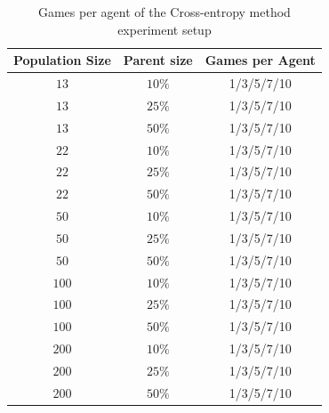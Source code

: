 \begin{table}[H]
\centering
\begin{tabular}{c c c}
Population Size & Parent size & Games per Agent\\
\hline
$13$ & $10\%$ & 1/3/5/7/10\\
$13$ & $25\%$ & 1/3/5/7/10\\
$13$ & $50\%$ & 1/3/5/7/10\\
$22$ & $10\%$ & 1/3/5/7/10\\
$22$ & $25\%$ & 1/3/5/7/10\\
$22$ & $50\%$ & 1/3/5/7/10\\
$50$ & $10\%$ & 1/3/5/7/10\\
$50$ & $25\%$ & 1/3/5/7/10\\
$50$ & $50\%$ & 1/3/5/7/10\\
$100$ & $10\%$  & 1/3/5/7/10\\
$100$ & $25\%$  & 1/3/5/7/10\\
$100$ & $50\%$ & 1/3/5/7/10\\
$200$ & $10\%$ & 1/3/5/7/10\\
$200$ & $25\%$ & 1/3/5/7/10\\
$200$ & $50\%$ & 1/3/5/7/10
\end{tabular}
\caption{Games per agent of the Cross-entropy method experiment setup\label{GamesPerAgentCE}}
\end{table}

